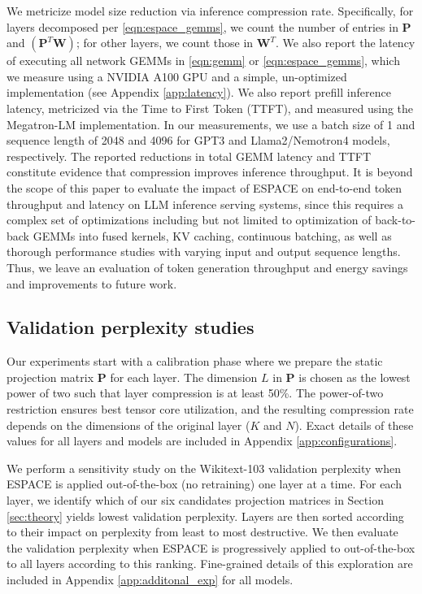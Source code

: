 \documentclass{article}
\theoremstyle{plain}
\begin{document}
We metricize model size reduction via inference compression rate. Specifically, for layers decomposed per \eqref{eqn:espace_gemms}, we count the number of entries in $\mathbf{P}$ and $\left( \mathbf{P}^T \mathbf{W}\right)$; for other layers, we count those in $\mathbf{W}^T$. We also report the latency of executing all network GEMMs in \eqref{eqn:gemm} or \eqref{eqn:espace_gemms}, which we measure using a NVIDIA A100 GPU and a simple, un-optimized implementation (see Appendix \ref{app:latency}). {We also report prefill inference latency, metricized via the Time to First Token (TTFT), and measured using the Megatron-LM implementation.} {In our measurements, we use a batch size of 1 and sequence length of 2048 and 4096 for GPT3 and Llama2/Nemotron4 models, respectively.} The reported reductions in total GEMM latency and TTFT constitute evidence that compression improves inference throughput. It is beyond the scope of this paper to evaluate the impact of ESPACE on end-to-end token throughput and latency on LLM inference serving systems, since this requires a complex set of optimizations including but not limited to optimization of back-to-back GEMMs into fused kernels, KV caching, continuous batching, as well as thorough performance studies with varying input and output sequence lengths. Thus, we leave an evaluation of token generation throughput and energy savings and improvements to future work.


\subsection{Validation perplexity studies}
Our experiments start with a calibration phase where we prepare the static projection matrix $\mathbf{P}$ for each layer. The dimension $L$ in $\mathbf{P}$ is chosen as the lowest power of two such that layer compression is at least 50\%. The power-of-two restriction ensures best tensor core utilization, and the resulting compression rate depends on the dimensions of the original layer ($K$ and $N$). Exact details of these values for all layers and models are included in Appendix \ref{app:configurations}.

We perform a sensitivity study on the Wikitext-103 validation perplexity when ESPACE is applied out-of-the-box (no retraining) one layer at a time. For each layer, we identify which of our six candidates projection matrices in Section \ref{sec:theory} yields lowest validation perplexity. Layers are then sorted according to their impact on perplexity from least to most destructive. We then evaluate the validation perplexity when ESPACE is progressively applied to out-of-the-box to all layers according to this ranking. Fine-grained details of this exploration are included in Appendix \ref{app:additonal_exp} for all models.
\end{document}
